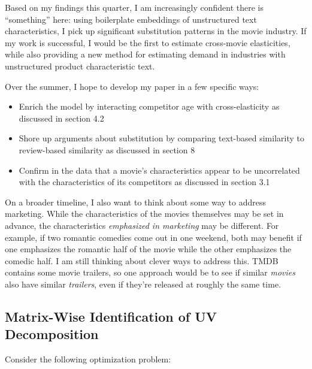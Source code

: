 \documentclass{article}
\begin{document}
Based on my findings this quarter, I am increasingly confident there is ``something'' here: using boilerplate embeddings of unstructured text characteristics, I pick up significant substitution patterns in the movie industry. If my work is successful, I would be the first to estimate cross-movie elasticities, while also providing a new method for estimating demand in industries with unstructured product characteristic text.

Over the summer, I hope to develop my paper in a few specific ways:
\begin{itemize}
    \item Enrich the model by interacting competitor age with cross-elasticity as discussed in section 4.2
    \item Shore up arguments about substitution by comparing text-based similarity to review-based similarity as discussed in section 8
    \item Confirm in the data that a movie's characteristics appear to be uncorrelated with the characteristics of its competitors as discussed in section 3.1
\end{itemize}

On a broader timeline, I also want to think about some way to address marketing. While the characteristics of the movies themselves may be set in advance, the characteristics \emph{emphasized in marketing} may be different. For example, if two romantic comedies come out in one weekend, both may benefit if one emphasizes the romantic half of the movie while the other emphasizes the comedic half. I am still thinking about clever ways to address this. TMDB contains some movie trailers, so one approach would be to see if similar \emph{movies} also have similar \emph{trailers}, even if they're released at roughly the same time. 

\printbibliography

\begin{appendices}

\section{Matrix-Wise Identification of UV Decomposition}
\label{app:uv}

Consider the following optimization problem:

\end{appendices}
\end{document}
